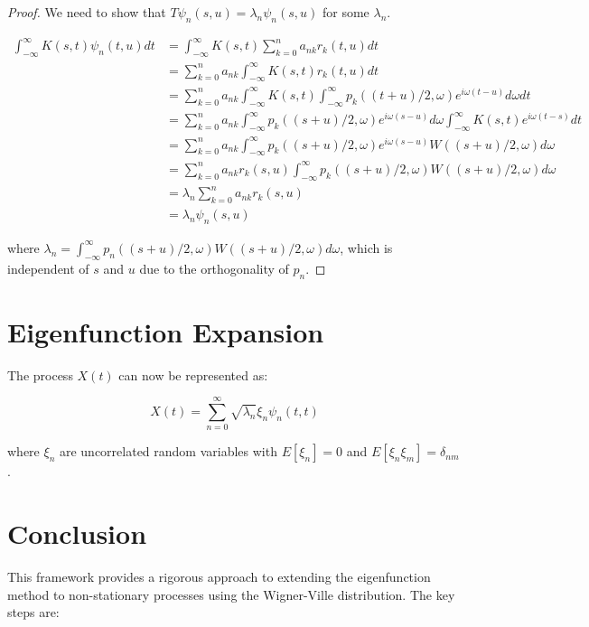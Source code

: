 \documentclass{article}
\begin{document}
\begin{proof}
We need to show that $T\psi_n(s,u) = \lambda_n \psi_n(s,u)$ for some $\lambda_n$. 

\begin{align*}
\int_{-\infty}^{\infty} K(s,t) \psi_n(t,u) dt 
&= \int_{-\infty}^{\infty} K(s,t) \sum_{k=0}^n a_{nk} r_k(t,u) dt \\
&= \sum_{k=0}^n a_{nk} \int_{-\infty}^{\infty} K(s,t) r_k(t,u) dt \\
&= \sum_{k=0}^n a_{nk} \int_{-\infty}^{\infty} K(s,t) \int_{-\infty}^{\infty} p_k((t+u)/2, \omega) e^{i\omega(t-u)} d\omega dt \\
&= \sum_{k=0}^n a_{nk} \int_{-\infty}^{\infty} p_k((s+u)/2, \omega) e^{i\omega(s-u)} d\omega \int_{-\infty}^{\infty} K(s,t) e^{i\omega(t-s)} dt \\
&= \sum_{k=0}^n a_{nk} \int_{-\infty}^{\infty} p_k((s+u)/2, \omega) e^{i\omega(s-u)} W((s+u)/2, \omega) d\omega \\
&= \sum_{k=0}^n a_{nk} r_k(s,u) \int_{-\infty}^{\infty} p_k((s+u)/2, \omega) W((s+u)/2, \omega) d\omega \\
&= \lambda_n \sum_{k=0}^n a_{nk} r_k(s,u) \\
&= \lambda_n \psi_n(s,u)
\end{align*}

where $\lambda_n = \int_{-\infty}^{\infty} p_n((s+u)/2, \omega) W((s+u)/2, \omega) d\omega$, which is independent of $s$ and $u$ due to the orthogonality of $p_n$.
\end{proof}

\section{Eigenfunction Expansion}

The process $X(t)$ can now be represented as:

\begin{equation}
X(t) = \sum_{n=0}^{\infty} \sqrt{\lambda_n} \xi_n \psi_n(t,t)
\end{equation}

where $\xi_n$ are uncorrelated random variables with $E[\xi_n] = 0$ and $E[\xi_n \xi_m] = \delta_{nm}$.

\section{Conclusion}

This framework provides a rigorous approach to extending the eigenfunction method to non-stationary processes using the Wigner-Ville distribution. The key steps are:
\end{document}
